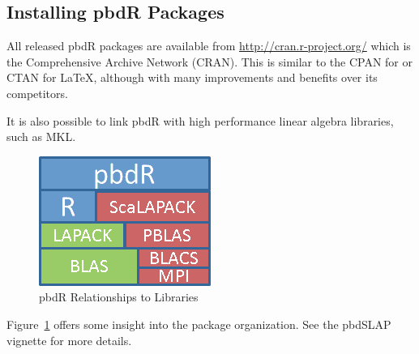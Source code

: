 \subsection{Installing pbdR Packages}
All released pbdR packages are available from \url{http://cran.r-project.org/} which is the Comprehensive  Archive Network (CRAN).  This is similar to the CPAN for  or CTAN for \LaTeX, although with many improvements and benefits over its competitors.

It is also possible to link pbdR with high performance linear algebra libraries, such as MKL.
\begin{figure}[h]
\centering
\includegraphics[scale=.7]{_all/pics/libs.png}
\caption{pbdR Relationships to Libraries}\label{fig:pbd}
\end{figure}
Figure~\ref{fig:pbd} offers some insight into the package organization.  See the pbdSLAP vignette for more details.